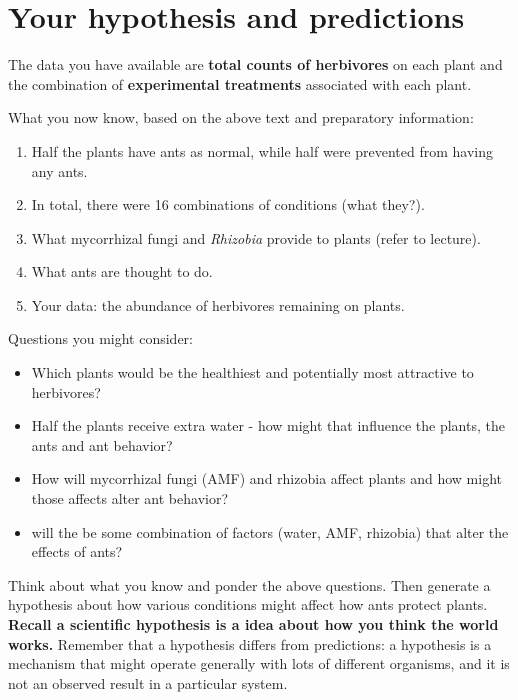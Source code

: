 \documentclass[
  letterpaper,
  DIV=11,
  numbers=noendperiod]{scrreprt}
\providecommand{\tightlist}{%
  \setlength{\itemsep}{0pt}\setlength{\parskip}{0pt}}
\begin{document}
\section{Your hypothesis and
predictions}\label{your-hypothesis-and-predictions}

The data you have available are \textbf{total counts of herbivores} on
each plant and the combination of \textbf{experimental treatments}
associated with each plant.

What you now know, based on the above text and preparatory information:

\begin{enumerate}
\def\labelenumi{\arabic{enumi}.}
\tightlist
\item
  Half the plants have ants as normal, while half were prevented from
  having any ants.
\item
  In total, there were 16 combinations of conditions (what they?).
\item
  What mycorrhizal fungi and \emph{Rhizobia} provide to plants (refer to
  lecture).
\item
  What ants are thought to do.
\item
  Your data: the abundance of herbivores remaining on plants.
\end{enumerate}

Questions you might consider:

\begin{itemize}
\tightlist
\item
  Which plants would be the healthiest and potentially most attractive
  to herbivores?
\item
  Half the plants receive extra water - how might that influence the
  plants, the ants and ant behavior?
\item
  How will mycorrhizal fungi (AMF) and rhizobia affect plants and how
  might those affects alter ant behavior?
\item
  will the be some combination of factors (water, AMF, rhizobia) that
  alter the effects of ants?
\end{itemize}

Think about what you know and ponder the above questions. Then generate
a hypothesis about how various conditions might affect how ants protect
plants. \textbf{Recall a scientific hypothesis is a idea about how you
think the world works.} Remember that a hypothesis differs from
predictions: a hypothesis is a mechanism that might operate generally
with lots of different organisms, and it is not an observed result in a
particular system.
\end{document}
